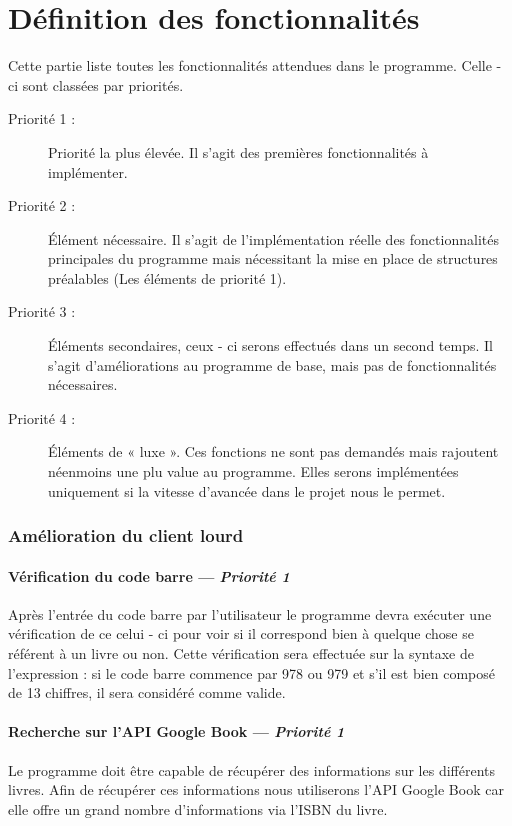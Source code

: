 \part{Définition des fonctionnalités}
Cette partie liste toutes les fonctionnalités attendues dans le programme. Celle - ci sont classées par priorités.

\begin{description}
\item [Priorité 1 :]
	Priorité la plus élevée. Il s'agit des premières fonctionnalités à implémenter.

\item [Priorité 2 :]
	Élément nécessaire. Il s'agit de l'implémentation réelle des fonctionnalités principales du programme mais nécessitant la mise en place de structures préalables (Les éléments de priorité 1). 

\item [Priorité 3 :]
	Éléments secondaires, ceux - ci serons effectués dans un second temps. Il s'agit d'améliorations au programme de base, mais pas de fonctionnalités nécessaires.  

\item [Priorité 4 :]
	Éléments de « luxe ». Ces fonctions ne sont pas demandés mais rajoutent néenmoins une plu value au programme. Elles serons implémentées uniquement si la vitesse d'avancée dans le projet nous le permet.
\end{description}


\section{Amélioration du client lourd}


\subsection[Vérification du code barre]{Vérification du code barre — \emph{Priorité 1}}
Après l'entrée du code barre par l'utilisateur le programme devra exécuter une vérification de ce celui - ci pour voir si il correspond bien à quelque chose se référent à un livre ou non. 
Cette vérification sera effectuée sur la syntaxe de l'expression : si le code barre commence par 978 ou 979 et s'il est bien composé de 13 chiffres, il sera considéré comme valide. 

\subsection[Recherche sur l'API Google book]{Recherche sur l'API Google Book — \emph{Priorité 1}}
Le programme doit être capable de récupérer des informations sur les différents livres.
Afin de récupérer ces informations nous utiliserons l'API Google Book car elle offre un grand nombre d'informations via l'ISBN du livre.

